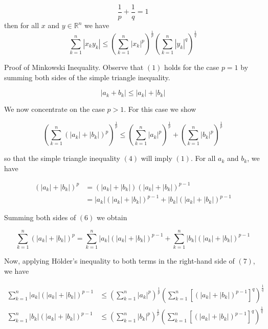 \documentclass{article}
\begin{document}
\begin{enumerate}
	      \begin{equation}
		      \frac{1}{p} + \frac{1}{q} = 1
	      \end{equation}
	      then for all $x$ and $y \in \mathbb{R}^n$ we have
	      \begin{equation}
		      \sum_{k=1}^{n}|x_ky_k| \leq \left(\sum_{k=1}^{n}|x_k|^p\right)^\frac{1}{p}\left(\sum_{k=1}^{n}|y_k|^q\right)^\frac{1}{q}
	      \end{equation}

	      Proof of Minkowski Inequality. Observe that $(1)$ holds for the case $p = 1$ by summing both sides of the simple triangle inequality.

	      \begin{equation}
		      |a_k + b_k| \leq |a_k| + |b_k|
	      \end{equation}

	      We now concentrate on the case $p > 1$. For this case we show

	      \begin{equation}
		      \left(\sum_{k=1}^{n}(|a_k| + |b_k|)^p\right)^\frac{1}{p} \leq \left(\sum_{k=1}^{n}|a_k|^p\right)^\frac{1}{p} + \left(\sum_{k=1}^{n}|b_k|^p\right)^\frac{1}{p}
	      \end{equation}

	      so that the simple triangle inequality $(4)$ will imply $(1)$.
	      For all $a_k$ and $b_k$, we have

	      \begin{equation}
		      \begin{split}
			      (|a_k| + |b_k|)^p & = (|a_k| + |b_k|)(|a_k| + |b_k|)^{p-1}                    \\
			                        & = |a_k|(|a_k| + |b_k|)^{p-1} + |b_k|(|a_k| + |b_k|)^{p-1}
		      \end{split}
	      \end{equation}

	      Summing both sides of $(6)$ we obtain

	      \begin{equation}
		      \sum_{k=1}^{n}(|a_k| + |b_k|)^p = \sum_{k=1}^{n}|a_k|(|a_k| + |b_k|)^{p-1} + \sum_{k=1}^{n}|b_k|(|a_k| + |b_k|)^{p-1}
	      \end{equation}

	      Now, applying Hölder's inequality to both terms in the right-hand side of $(7)$, we have

	      \begin{align}
		      \sum_{k=1}^{n}|a_k|(|a_k| + |b_k|)^{p-1} & \leq \left(\sum_{k=1}^{n}|a_k|^p\right)^\frac{1}{p} \left(\sum_{k=1}^{n}[(|a_k| + |b_k|)^{p-1}]^q\right)^\frac{1}{q} \\
		      \sum_{k=1}^{n}|b_k|(|a_k| + |b_k|)^{p-1} & \leq \left(\sum_{k=1}^{n}|b_k|^p\right)^\frac{1}{p} \left(\sum_{k=1}^{n}[(|a_k| + |b_k|)^{p-1}]^q\right)^\frac{1}{q}
	      \end{align}


\end{enumerate}
\end{document}
